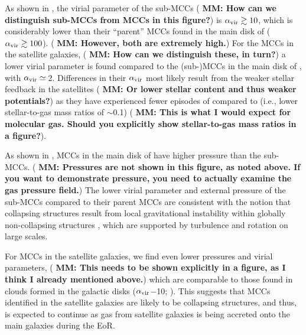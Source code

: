 \IfFileExists{emulateapjlegacy.cls}{\documentclass[iop]{emulateapjlegacy}}{\documentclass[iop]{emulateapj}}
\newcommand{\MM}[1]{({\bf \color{mmcolor} MM: #1})}
\begin{document}

As shown in ,
the virial parameter of the sub-MCCs \MM{How can we distinguish
  sub-MCCs from MCCs in this figure?} is $\alpha_{\rm vir}\gtrsim10$,
which is considerably lower than their ``parent'' MCCs found in the
main disk of \flower ($\alpha_{\rm vir}\gtrsim100$).  \MM{However,
  both are extremely high.}
%
For the MCCs in the satellite galaxies, \MM{How can we distinguish
  these, in turn?} a lower virial parameter is found compared to the (sub-)MCCs in the main disk of \flower, with $\alpha_{\rm vir}\simeq$\,2.
Differences in their $\alpha_{\rm vir}$ most likely result from the
weaker stellar feedback in the satellites \MM{Or lower stellar content
and thus weaker potentials?} as they have experienced fewer episodes
of \SF compared to \flower (i.e., lower stellar-to-gas mass ratios of
$\sim$0.1) \MM{This is what I would expect for molecular gas.  Should
  you explicitly show stellar-to-gas mass ratios in a figure?}.

As shown in ,
MCCs in the main disk of \flower have higher pressure than the
sub-MCCs. \MM{Pressures are not shown in this figure, as noted
  above. If you want to demonstrate pressure, you need to actually
  examine the gas pressure field.} The lower virial parameter and external pressure of the sub-MCCs compared to their parent MCCs are consistent with the notion that collapsing structures result from local gravitational instability within globally non-collapsing structures \citep[see e.g.,][]{Ballesteros-Paredes11a}, which are supported by turbulence and rotation on large scales.

For MCCs in the satellite galaxies, we find even lower pressures and
virial parameters, \MM{This needs to be shown explicitly in a figure,
  as I think I already mentioned above.} which are comparable to those found in clouds formed in the galactic disks  ($\alpha_{\rm vir}$$-$10; \citealt{Dobbs08a, Tasker09a}).
This suggests that MCCs identified in the satellite galaxies are likely to be collapsing structures, and thus, \SF is expected to continue as gas from satellite galaxies is being accreted onto the main galaxies during the EoR.
\end{document}
